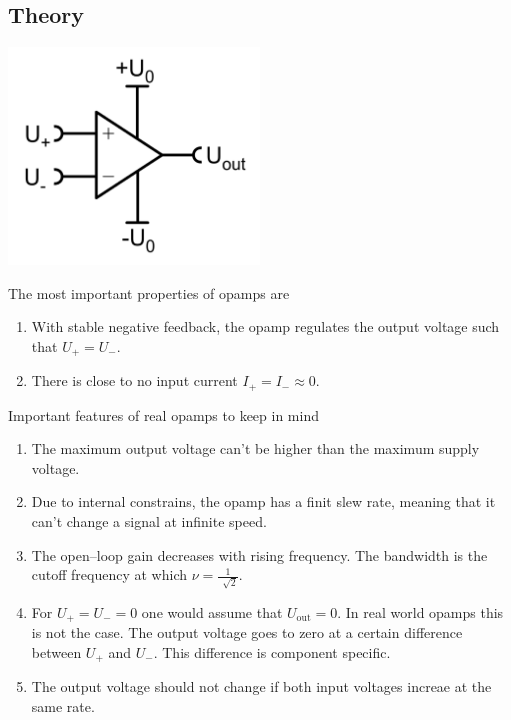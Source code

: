\documentclass[a4paper,10pt]{article}
\newenvironment{Figure}
        {\par\medskip\noindent\minipage{\linewidth}}
        {\endminipage\par\medskip}
\numberwithin{equation}{section}
\begin{document}
\begin{multicols}{2}
        \section{Theory}
        \begin{Figure}
                \centering
                \includegraphics[width=0.5\textwidth]{opamp.png}
        \end{Figure}
        \noindent The most important properties of opamps are
        \begin{enumerate}[label=--]
                \item With stable negative feedback, the opamp regulates the output voltage such that $U_+=U_-$.
                \item There is close to no input current $I_+=I_-\approx 0$.
        \end{enumerate}
        Important features of real opamps to keep in mind
        \begin{enumerate}[label=--]
                \item The maximum output voltage can't be higher than the maximum supply voltage.
                \item Due to internal constrains, the opamp has a finit slew rate, meaning that it can't change a signal at infinite speed.
                \item The open--loop gain decreases with rising frequency.
                        The bandwidth is the cutoff frequency at which $\nu =\tfrac{1}{\,\sqrt[]{2}}$.
                \item For $U_+=U_-=0$ one would assume that $U_\text{out}=0$.
                        In real world opamps this is not the case.
                        The output voltage goes to zero at a certain difference between $U_+$ and $U_-$.
                        This difference is component specific.
                \item The output voltage should not change if both input voltages increae at the same rate.

\end{enumerate}
\end{multicols}
\end{document}
